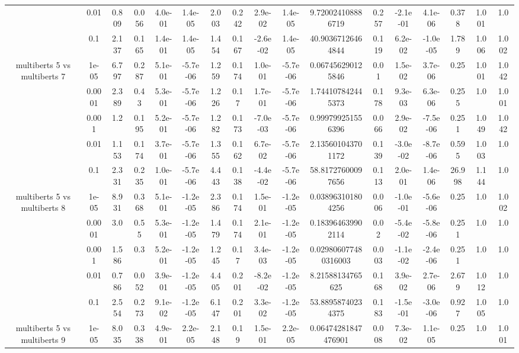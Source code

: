 \begin{tabular}{|c|c|c|c|c|c|c|c|c|c|c|c|c|c|c|c|c|}
 & 0.01 & 0.809 & 0.056 & 4.0e-01 & 1.4e-05 & 2.003 & 0.242 & 2.9e-02 & 1.4e-05 & 9.720024108886719 & 0.257 & -2.1e-01 & 4.1e-06 & 0.378 & 1.001 & 1.0 \\
 & 0.1 & 2.137 & 0.165 & 1.4e-01 & 1.4e-05 & 1.454 & 0.167 & -2.6e-02 & 1.4e-05 & 40.90367126464844 & 0.119 & 6.2e-02 & -1.0e-05 & 1.789 & 1.006 & 1.002 \\
\hline
\multirow{5}{*}{multiberts 5 vs multiberts 7} & 1e-05 & 6.797 & 0.287 & 5.1e-01 & -5.7e-06 & 1.259 & 0.174 & 1.0e-01 & -5.7e-06 & 0.067456290125846 & 0.01 & 1.5e-02 & 3.7e-06 & 0.25 & 1.001 & 1.042 \\
 & 0.0001 & 2.389 & 0.43 & 5.3e-01 & -5.7e-06 & 1.226 & 0.17 & 1.7e-01 & -5.7e-06 & 1.744107842445373 & 0.178 & 9.3e-03 & 6.3e-06 & 0.255 & 1.0 & 1.001 \\
 & 0.001 & 1.2 & 0.195 & 5.2e-01 & -5.7e-06 & 1.282 & 0.173 & -7.0e-03 & -5.7e-06 & 0.999799251556396 & 0.066 & 2.9e-02 & -7.5e-06 & 0.251 & 1.049 & 1.042 \\
 & 0.01 & 1.153 & 0.174 & 3.7e-01 & -5.7e-06 & 1.355 & 0.162 & 6.7e-02 & -5.7e-06 & 2.135601043701172 & 0.139 & -3.0e-02 & -8.7e-06 & 0.595 & 1.003 & 1.0 \\
 & 0.1 & 2.331 & 0.235 & 1.0e-01 & -5.7e-06 & 4.443 & 0.138 & -4.4e-02 & -5.7e-06 & 58.81727600097656 & 0.113 & 2.0e-01 & 1.4e-06 & 26.998 & 1.144 & 1.0 \\
\hline
\multirow{5}{*}{multiberts 5 vs multiberts 8} & 1e-05 & 8.931 & 0.368 & 5.1e-01 & -1.2e-05 & 2.386 & 0.174 & 1.5e-01 & -1.2e-05 & 0.038963101804256 & 0.006 & -1.0e-01 & -5.6e-06 & 0.25 & 1.0 & 1.002 \\
 & 0.0001 & 3.0 & 0.55 & 5.3e-01 & -1.2e-05 & 1.479 & 0.174 & 2.1e-01 & -1.2e-05 & 0.183964639902114 & 0.02 & -5.4e-02 & -5.8e-06 & 0.251 & 1.0 & 1.0 \\
 & 0.001 & 1.586 & 0.3 & 5.2e-01 & -1.2e-05 & 1.245 & 0.17 & 3.4e-03 & -1.2e-05 & 0.029806077480316003 & 0.003 & -1.1e-02 & -2.4e-06 & 0.251 & 1.0 & 1.0 \\
 & 0.01 & 0.786 & 0.052 & 3.9e-01 & -1.2e-05 & 4.405 & 0.201 & -8.2e-02 & -1.2e-05 & 8.21588134765625 & 0.168 & 3.9e-02 & 2.7e-06 & 2.679 & 1.012 & 1.0 \\
 & 0.1 & 2.554 & 0.273 & 9.1e-02 & -1.2e-05 & 6.147 & 0.201 & 3.3e-02 & -1.2e-05 & 53.88958740234375 & 0.183 & -1.5e-01 & -3.0e-06 & 0.927 & 1.005 & 1.0 \\
\hline
\multirow{5}{*}{multiberts 5 vs multiberts 9} & 1e-05 & 8.035 & 0.338 & 4.9e-01 & 2.2e-05 & 2.148 & 0.19 & 1.5e-01 & 2.2e-05 & 0.06474281847476901 & 0.008 & 7.3e-02 & 1.1e-05 & 0.25 & 1.0 & 1.001 \\

\end{tabular}
